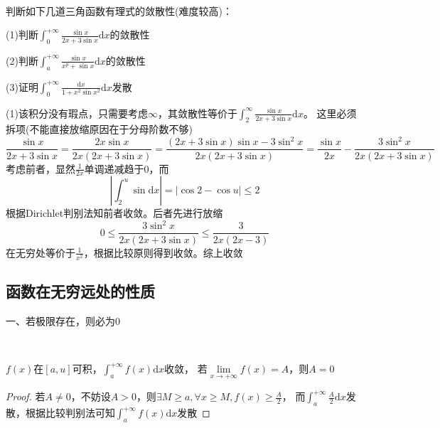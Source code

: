 ~

\begin{exercise}[三角有理式敛散性判别]
  判断如下几道三角函数有理式的敛散性(难度较高)：

  (1)判断$\int_0^{+\infty} \frac{\sin x}{2x + 3 \sin x} \mathrm{d} x$的敛散性

  (2)判断$\int_a^{+\infty} \frac{\sin x}{x^p + \sin x}\mathrm{d} x$的敛散性

  (3)证明$\int_0^{+\infty} \frac{\mathrm{d} x}{1 + x^2 \sin x^2}\mathrm{d} x$发散
\end{exercise}

\begin{solution}
  (1)该积分没有瑕点，只需要考虑$\infty$，其敛散性等价于$\int_2^{\infty} \frac{\sin x}{2x + 3 \sin x}\mathrm{d} x$。
  这里必须拆项(不能直接放缩原因在于分母阶数不够)
  \begin{equation*}
    \frac{\sin x}{2x + 3 \sin x} =\frac{2x \sin x}{2x(2x + 3\sin x)} = \frac{(2x + 3 \sin x)\sin x - 3\sin^2x}{2x(2x + 3\sin x) } =  \frac{\sin x}{2x} - \frac{3\sin^2 x}{2x(2x + 3\sin x)}
  \end{equation*}
  考虑前者，显然$\frac{1}{2x}$单调递减趋于$0$，而
  \begin{equation*}
    \left| \int_2^u \sin \mathrm{d} x  \right| = \left| \cos 2 - \cos u \right| \leq 2
  \end{equation*}
  根据Dirichlet判别法知前者收敛。后者先进行放缩
  \begin{equation*}
    0 \leq \frac{3 \sin^2 x}{2x(2x + 3 \sin x)} \leq \frac{3}{2x(2x - 3)}
  \end{equation*}
  在无穷处等价于$\frac{1}{x^2}$，根据比较原则得到收敛。综上收敛
\end{solution}


\subsection{函数在无穷远处的性质}

\noindent 一、若极限存在，则必为$0$

~

\begin{exercise}
  $f(x)$在$[a,u]$可积，$\int_a^{+\infty}f(x)\mathrm{d}x$收敛，
  若$\lim \limits _{x \rightarrow +\infty}f(x) = A$，则$A = 0$
\end{exercise}

\begin{proof}
  若$A \neq 0$，不妨设$A > 0$，则$\exists M \geq a, \forall x \geq M, f(x) \geq \frac{A}{2}$，
  而$\int_a^{+\infty}\frac{A}{2}\mathrm{d}x$发散，根据比较判别法可知$\int_a^{+\infty}f(x)\mathrm{d}x$发散
\end{proof}

